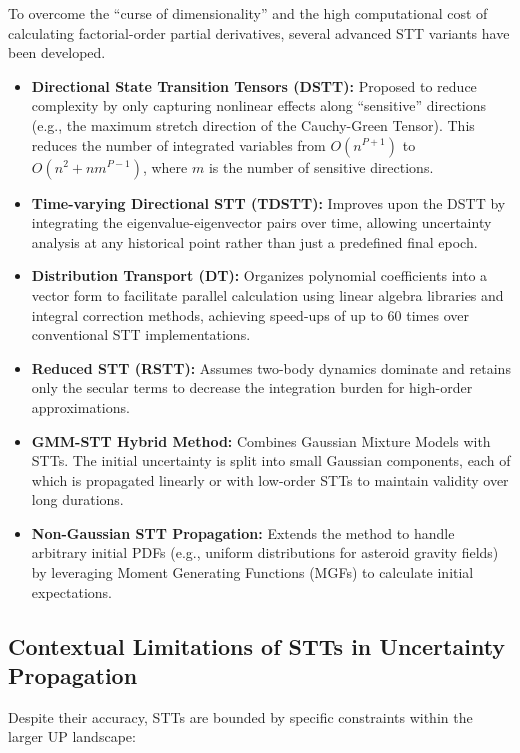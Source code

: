 \documentclass[
  letterpaper,
  DIV=11,
  numbers=noendperiod,
  oneside]{scrartcl}
\begin{document}
To overcome the ``curse of dimensionality'' and the high computational
cost of calculating factorial-order partial derivatives, several
advanced STT variants have been developed.

\begin{itemize}
\item
  \textbf{Directional State Transition Tensors (DSTT):} Proposed to
  reduce complexity by only capturing nonlinear effects along
  ``sensitive'' directions (e.g., the maximum stretch direction of the
  Cauchy-Green Tensor). This reduces the number of integrated variables
  from \(O(n^{P+1})\) to \(O(n^2 + nm^{P-1})\), where \(m\) is the
  number of sensitive directions.
\item
  \textbf{Time-varying Directional STT (TDSTT):} Improves upon the DSTT
  by integrating the eigenvalue-eigenvector pairs over time, allowing
  uncertainty analysis at any historical point rather than just a
  predefined final epoch.
\item
  \textbf{Distribution Transport (DT):} Organizes polynomial
  coefficients into a vector form to facilitate parallel calculation
  using linear algebra libraries and integral correction methods,
  achieving speed-ups of up to 60 times over conventional STT
  implementations.
\item
  \textbf{Reduced STT (RSTT):} Assumes two-body dynamics dominate and
  retains only the secular terms to decrease the integration burden for
  high-order approximations.
\item
  \textbf{GMM-STT Hybrid Method:} Combines Gaussian Mixture Models with
  STTs. The initial uncertainty is split into small Gaussian components,
  each of which is propagated linearly or with low-order STTs to
  maintain validity over long durations.
\item
  \textbf{Non-Gaussian STT Propagation:} Extends the method to handle
  arbitrary initial PDFs (e.g., uniform distributions for asteroid
  gravity fields) by leveraging Moment Generating Functions (MGFs) to
  calculate initial expectations.
\end{itemize}

\subsection{Contextual Limitations of STTs in Uncertainty
Propagation}\label{contextual-limitations-of-stts-in-uncertainty-propagation}

Despite their accuracy, STTs are bounded by specific constraints within
the larger UP landscape:
\end{document}
